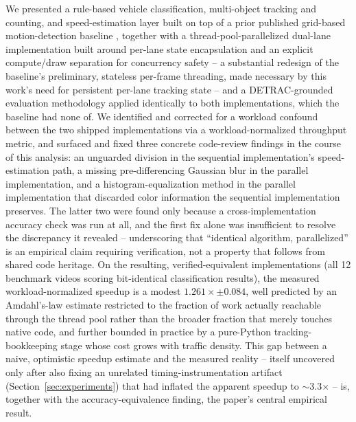 \documentclass[conference]{IEEEtran}
\begin{document}
We presented a rule-based vehicle classification, multi-object
tracking and counting, and speed-estimation layer built on top of a
prior published grid-based motion-detection baseline \cite{baseline},
together with a thread-pool-parallelized dual-lane implementation built
around per-lane state encapsulation and an explicit compute/draw
separation for concurrency safety -- a substantial redesign of the
baseline's preliminary, stateless per-frame threading, made necessary by
this work's need for persistent per-lane tracking state -- and a
DETRAC-grounded evaluation methodology applied identically to both
implementations, which the baseline had none of. We identified and
corrected for a workload confound between the two shipped
implementations via a workload-normalized throughput metric, and
surfaced and fixed three concrete code-review findings in the course of
this analysis: an unguarded division in the sequential implementation's
speed-estimation path, a missing pre-differencing Gaussian blur in the
parallel implementation, and a histogram-equalization method in the
parallel implementation that discarded color information the sequential
implementation preserves. The latter two were found only because a
cross-implementation accuracy check was run at all, and the first fix
alone was insufficient to resolve the discrepancy it revealed --
underscoring that ``identical algorithm, parallelized'' is an empirical
claim requiring verification, not a property that follows from shared
code heritage. On the resulting, verified-equivalent implementations
(all 12 benchmark videos scoring bit-identical classification results),
the measured workload-normalized speedup is a modest $1.261\times \pm
0.084$, well predicted by an Amdahl's-law estimate restricted to the
fraction of work actually reachable through the thread pool rather than
the broader fraction that merely touches native code, and further
bounded in practice by a pure-Python tracking-bookkeeping stage whose
cost grows with traffic density. This gap between a naive, optimistic
speedup estimate and the measured reality -- itself uncovered only after
also fixing an unrelated timing-instrumentation artifact
(Section~\ref{sec:experiments}) that had inflated the apparent speedup
to $\sim$3.3$\times$ -- is, together with the accuracy-equivalence
finding, the paper's central empirical result.
\end{document}
